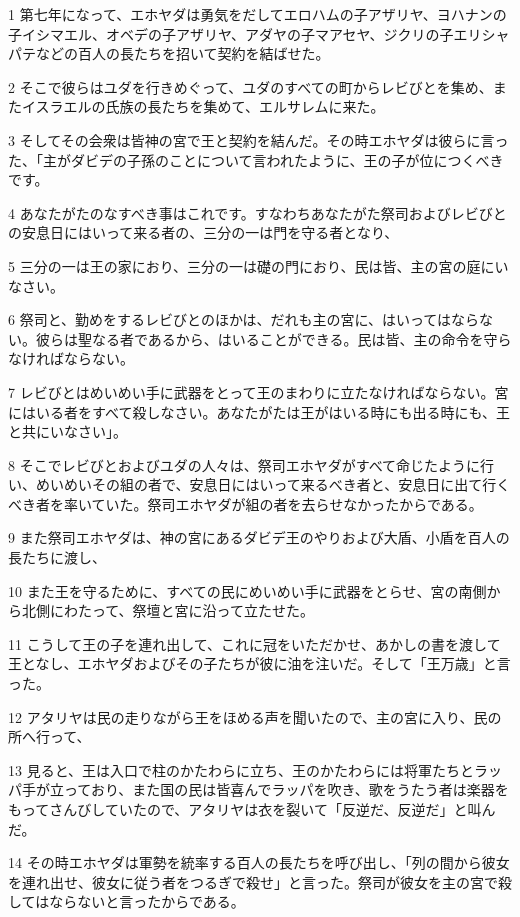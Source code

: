 \par 1 第七年になって、エホヤダは勇気をだしてエロハムの子アザリヤ、ヨハナンの子イシマエル、オベデの子アザリヤ、アダヤの子マアセヤ、ジクリの子エリシャパテなどの百人の長たちを招いて契約を結ばせた。
\par 2 そこで彼らはユダを行きめぐって、ユダのすべての町からレビびとを集め、またイスラエルの氏族の長たちを集めて、エルサレムに来た。
\par 3 そしてその会衆は皆神の宮で王と契約を結んだ。その時エホヤダは彼らに言った、「主がダビデの子孫のことについて言われたように、王の子が位につくべきです。
\par 4 あなたがたのなすべき事はこれです。すなわちあなたがた祭司およびレビびとの安息日にはいって来る者の、三分の一は門を守る者となり、
\par 5 三分の一は王の家におり、三分の一は礎の門におり、民は皆、主の宮の庭にいなさい。
\par 6 祭司と、勤めをするレビびとのほかは、だれも主の宮に、はいってはならない。彼らは聖なる者であるから、はいることができる。民は皆、主の命令を守らなければならない。
\par 7 レビびとはめいめい手に武器をとって王のまわりに立たなければならない。宮にはいる者をすべて殺しなさい。あなたがたは王がはいる時にも出る時にも、王と共にいなさい」。
\par 8 そこでレビびとおよびユダの人々は、祭司エホヤダがすべて命じたように行い、めいめいその組の者で、安息日にはいって来るべき者と、安息日に出て行くべき者を率いていた。祭司エホヤダが組の者を去らせなかったからである。
\par 9 また祭司エホヤダは、神の宮にあるダビデ王のやりおよび大盾、小盾を百人の長たちに渡し、
\par 10 また王を守るために、すべての民にめいめい手に武器をとらせ、宮の南側から北側にわたって、祭壇と宮に沿って立たせた。
\par 11 こうして王の子を連れ出して、これに冠をいただかせ、あかしの書を渡して王となし、エホヤダおよびその子たちが彼に油を注いだ。そして「王万歳」と言った。
\par 12 アタリヤは民の走りながら王をほめる声を聞いたので、主の宮に入り、民の所へ行って、
\par 13 見ると、王は入口で柱のかたわらに立ち、王のかたわらには将軍たちとラッパ手が立っており、また国の民は皆喜んでラッパを吹き、歌をうたう者は楽器をもってさんびしていたので、アタリヤは衣を裂いて「反逆だ、反逆だ」と叫んだ。
\par 14 その時エホヤダは軍勢を統率する百人の長たちを呼び出し、「列の間から彼女を連れ出せ、彼女に従う者をつるぎで殺せ」と言った。祭司が彼女を主の宮で殺してはならないと言ったからである。
